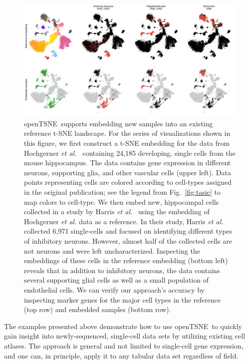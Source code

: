 \documentclass[letter]{article}
\newcommand{\opentsne}{\textsf{openTSNE}}
\begin{document}
\begin{figure}[htbp]
  \includegraphics[width=\textwidth]{transform_hochgerner}
  \caption{\label{fig:transform}
  \opentsne\ supports embedding new samples into an existing reference t-SNE
	landscape. For the series of visualizations shown in this figure, we
	first construct a t-SNE embedding for the data from Hochgerner
	\textit{et al.}~\cite{hochgerner2018conserved} containing 24,185
	developing, single cells from the mouse hippocampus. The data contains
	gene expression in different neurons, supporting glia, and other
	vascular cells (upper left). Data points representing cells are colored
	according to cell-types assigned in the original publication; see the
	legend from Fig.~\ref{fig:tasic} to map colors to cell-type. We then
	embed new, hippocampal cells collected in a study by Harris \textit{et
	al.}~\cite{harris2018classes} using the embedding of Hochgerner
	\textit{et al.} data as a reference. In their study, Harris \textit{et
	al.} collected 6,971 single-cells and focused on identifying different
	types of inhibitory neurons. However, almost half of the collected cells
	are not neurons and were left uncharacterized. Inspecting the embeddings
	of these cells in the reference embedding (bottom left) reveals that in
	addition to inhibitory neurons, the data contains several supporting
	glial cells as well as a small population of endothelial cells. We can
	verify our approach's accuracy by inspecting marker genes for the major
	cell types in the reference (top row) and embedded samples (bottom row).
}
\end{figure}

The examples presented above demonstrate how to use \opentsne\ to quickly gain
insight into newly-sequenced, single-cell data sets by utilizing existing cell
atlases. The approach is general and not limited to single-cell gene expression,
and one can, in principle, apply it to any tabular data set regardless of field.
\end{document}
